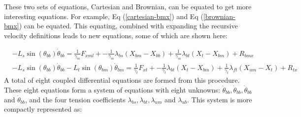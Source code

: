 \documentclass[
11pt, %
english, %
singlespacing, %
headsepline, %
chapterinoneline, %
]{MastersDoctoralThesis} %
\begin{document}
These two sets of equations, Cartesian and Brownian, can be equated to get more interesting equations. For example, Eq (\ref{cartesian-bmx}) and Eq (\ref{brownian-bmx}) can be equated. This equating, combined with expanding the recursive velocity definitions leads to new equations, some of which are shown here:

\begin{align}
  &-L_s\sin(\theta_{bb})\dot{\theta}_{bb} = \frac{1}{\gamma_m}F_{xml} + -\frac{1}{\gamma_m}\lambda_{bs}(X_{bm} - X_{bb}) + \frac{1}{\gamma_m}\lambda_{bt}(X_{t } - X_{bm}) + R_{bmx} \label{ob_system_first}\\
  &-L_s\sin(\theta_{bb})\dot{\theta}_{bb} - L_t\sin(\theta_{bm})\dot{\theta}_{bm} = \frac{1}{\gamma_t}F_{xt } + -\frac{1}{\gamma_t}\lambda_{bt}(X_{t } - X_{bm}) + \frac{1}{\gamma_t}\lambda_{ft}(X_{um} - X_{t }) + R_{tx}\label{ob_system_second}
\end{align}
%
A total of eight coupled differential equations are formed from this procedure. These eight equations form a system of equations with eight unknowns: $\dot{\theta}_{bb}, \dot{\theta}_{bb}, \dot{\theta}_{bb}$ and $\dot{\theta}_{bb}$, and the four tension coefficients $\lambda_{bs}, \lambda_{bt}, \lambda_{um}$ and $\lambda_{ub}$. This system is more compactly represented as:
\end{document}
